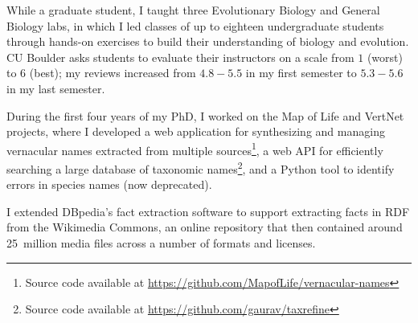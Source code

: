 While a graduate student, I taught three Evolutionary Biology and General Biology labs, in which I led classes of up to eighteen undergraduate students through hands-on exercises to build their understanding of biology and evolution. CU Boulder asks students to evaluate their instructors on a scale from $1$ (worst) to $6$ (best); my reviews increased from $4.8-5.5$ in my first semester to $5.3-5.6$ in my last semester.


During the first four years of my PhD, I worked on the Map of Life and VertNet projects, where I developed a web application for synthesizing and managing vernacular names extracted from multiple sources\footnote{Source code available at \url{https://github.com/MapofLife/vernacular-names}}, a web API for efficiently searching a large database of taxonomic names\footnote{Source code available at \url{https://github.com/gaurav/taxrefine}}, and a Python tool to identify errors in species names (now deprecated).

\begin{products}



\end{products}


I extended \mbox{DBpedia's} fact extraction software to support extracting facts in RDF from the Wikimedia Commons, an online repository that then contained around 25~million media files across a number of formats and licenses.

\begin{products}



\end{products}

